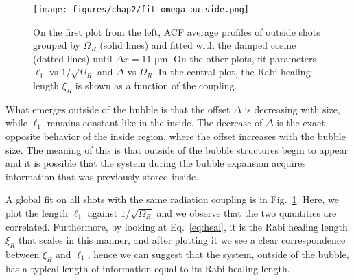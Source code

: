 \begin{figure}[ht!]
    \centering
    \texttt{[image: figures/chap2/fit\_omega\_outside.png]}
    \caption{On the first plot from the left, ACF average profiles of outside shots grouped by $\Omega_R$ (solid lines) and fitted with the damped cosine (dotted lines) until $\Delta x = 11$ \unit{\micro\meter}. On the other plots, fit parameters $\ell_1$ vs $1/\sqrt{\Omega_R}$ and $\Delta$ vs $\Omega_R$. In the central plot, the Rabi healing length $\xi_R$ is shown as a function of the coupling.}
    \label{fig:fit_omega_outside}
\end{figure}
What emerges outside of the bubble is that the offset $\Delta$ is decreasing with size, while $\ell_1$ remains constant like in the inside. The decrease of $\Delta$ is the exact opposite behavior of the inside region, where the offset increases with the bubble size. The meaning of this is that outside of the bubble structures begin to appear and it is possible that the system during the bubble expansion acquires information that was previously stored inside.

A global fit on all shots with the same radiation coupling is in Fig.\ \ref{fig:fit_omega_outside}. Here, we plot the length $\ell_1$ against $1/\sqrt{\Omega_R}$ and we observe that the two quantities are correlated. Furthermore, by looking at Eq.\ \eqref{eq:heal}, it is the Rabi healing length $\xi_R$ that scales in this manner, and after plotting it we see a clear correspondence between $\xi_R$ and $\ell_1$, hence we can suggest that the system, outside of the bubble, has a typical length of information equal to its Rabi healing length.

